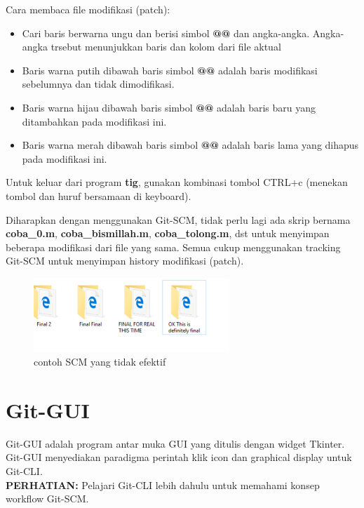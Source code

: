 \documentclass[12pt]{book}
\begin{document}
	Cara membaca file modifikasi (patch):
	\begin{itemize}
		\item Cari baris berwarna ungu dan berisi simbol \textbf{@@} dan angka-angka.
		Angka-angka trsebut menunjukkan baris dan kolom dari file aktual
		
		\item Baris warna putih dibawah baris simbol \textbf{@@} adalah baris modifikasi sebelumnya dan tidak dimodifikasi.
		
		\item Baris warna hijau dibawah baris simbol \textbf{@@} adalah baris baru yang ditambahkan pada modifikasi ini.
		
		\item Baris warna merah dibawah baris simbol \textbf{@@} adalah baris lama yang dihapus pada modifikasi ini.
	\end{itemize}

	Untuk keluar dari program \textbf{tig}, gunakan kombinasi tombol CTRL+c (menekan tombol  dan huruf  bersamaan di keyboard).

	Diharapkan dengan menggunakan Git-SCM, tidak perlu lagi ada skrip bernama \textbf{coba\_0.m}, \textbf{coba\_bismillah.m}, \textbf{coba\_tolong.m}, dst
	untuk menyimpan beberapa modifikasi dari file yang sama.
	Semua cukup menggunakan tracking Git-SCM untuk menyimpan history modifikasi (patch).
	
	\begin{figure}[!ht]
		\centering
		\includegraphics[width=210pt]{images/memescm}
		\caption{contoh SCM yang tidak efektif}
	\end{figure}
	
	\newpage
	\section{Git-GUI}
	
	Git-GUI adalah program antar muka GUI yang ditulis dengan widget Tkinter.
	Git-GUI menyediakan paradigma perintah klik icon dan graphical display untuk Git-CLI.\\
	
	\textbf{PERHATIAN:} Pelajari Git-CLI lebih dahulu untuk memahami konsep workflow Git-SCM.\\
	
\end{document}
